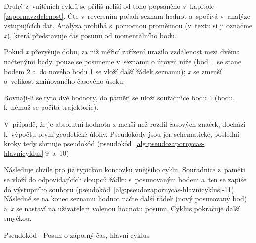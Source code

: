 Druhý z~vnitřních cyklů se příliš neliší od toho popsaného v~kapitole \ref{zapornavzdalenost}.
Čte v~reversním pořadí seznam hodnot a~spočívá v~analýze vstupujících dat. Analýza
probíhá s~pomocnou proměnnou (v~textu si ji označme
\textit{x}), která představuje čas posunu od momentálního bodu. 

Pokud \textit{x} převyšuje dobu, za niž měřicí zařízení urazilo vzdálenost mezi dvěma načtenými
body, pouze se posuneme v~seznamu o úroveň níže (bod~1 se stane bodem 2 a~do nového
bodu 1 se vloží další řádek seznamu); \textit{x} se zmenší o~velikost zmiňovaného časového úseku. 

Rovnají-li se tyto dvě hodnoty, do paměti se uloží
souřadnice bodu 1 (bodu, k~němuž se počítá trajektorie). 

V~případě, že je absolutní hodnota \textit{x} menší než rozdíl časových značek, dochází
k~výpočtu první geodetické úlohy. Pseudokódy jsou jen schematické, poslední kroky
tedy shrnuje pseudokód (pseudokód~\ref{alg:pseudozapornycas-hlavnicyklus}-9~a~10)

Následuje chvíle pro již typickou koncovku vnějšího cyklu. Souřadnice z~paměti se vloží
do odpovídajících sloupců řádku s~posunovaným bodem a~ten se zapíše do
výstupního souboru (pseudokód~\ref{alg:pseudozapornycas-hlavnicyklus}-11).
Následně se na konec seznamu hodnot načte další řádek (nový posunovaný bod) a~\textit{x}
se nastaví na uživatelem volenou hodnotu posunu. Cyklus pokračuje další smyčkou. 

\begin{algorithm}
    \caption{Pseudokód - Posun o záporný čas, hlavní cyklus}
    \label{alg:pseudozapornycas-hlavnicyklus}
    \begin{algorithmic}[1]
    \ENDIF
    \ENDFOR
\end{algorithmic}
\end{algorithm}

\begin{algorithm}                     
\begin{algorithmic} [1]
    \ENDWHILE
    \end{algorithmic}
\end{algorithm}

